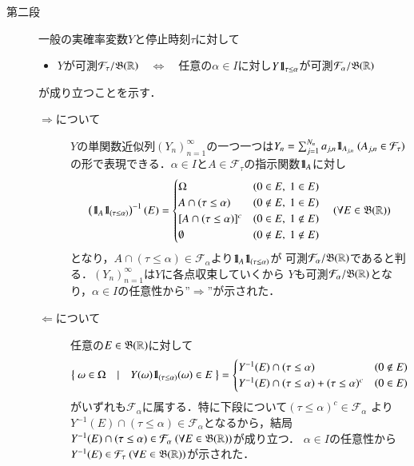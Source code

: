 \begin{prf}
\begin{description}
			\item[第二段] 一般の実確率変数$Y$と停止時刻$\tau$に対して
				\begin{itemize}
					\item $Y$が可測$\mathcal{F}_\tau/\mathfrak{B}(\mathbb{R})$$\quad \Leftrightarrow \quad$任意の$\alpha \in I$に対し$Y \mbox{1}\hspace{-0.25em}\mbox{l}_{\tau \leq \alpha}$が可測$\mathcal{F}_\alpha/\mathfrak{B}(\mathbb{R})$
				\end{itemize}
				が成り立つことを示す．
				\begin{description}
					\item[$\Rightarrow$について]
						$Y$の単関数近似列$(Y_n)_{n=1}^{\infty}$の一つ一つは$Y_n = \sum_{j=1}^{N_n}a_{j,n}\defunc_{A_{j,n}}\ (A_{j,n} \in \mathcal{F}_\tau)$
						の形で表現できる．$\alpha \in I$と$A \in \mathcal{F}_\tau$の指示関数$\mbox{1}\hspace{-0.25em}\mbox{l}_{A}$に対し
						\begin{align}
							\left( \mbox{1}\hspace{-0.25em}\mbox{l}_A\mbox{1}\hspace{-0.25em}\mbox{l}_{(\tau \leq \alpha)} \right)^{-1}(E) =
							\begin{cases}
								\Omega & (0 \in E,\ 1 \in E) \\
								A \cap (\tau \leq \alpha) & (0 \notin E,\ 1 \in E) \\
								[A \cap (\tau \leq \alpha)]^c & (0 \in E,\ 1 \notin E) \\
								\emptyset & (0 \notin E,\ 1 \notin E)
							\end{cases}
							\quad (\forall E \in \mathfrak{B}(\mathbb{R}))
						\end{align}
						となり，$A \cap (\tau \leq \alpha) \in \mathcal{F}_\alpha$より$\mbox{1}\hspace{-0.25em}\mbox{l}_A\mbox{1}\hspace{-0.25em}\mbox{l}_{(\tau \leq \alpha)}$が
						可測$\mathcal{F}_\alpha/\mathfrak{B}(\mathbb{R})$であると判る．$(Y_n)_{n=1}^{\infty}$は$Y$に各点収束していくから
						$Y$も可測$\mathcal{F}_\alpha/\mathfrak{B}(\mathbb{R})$となり，$\alpha \in I$の任意性から''$\Rightarrow$''が示された．
						
					\item[$\Leftarrow$について]
						任意の$E \in \mathfrak{B}(\mathbb{R})$に対して
						\begin{align}
							\left\{\ \omega \in \Omega\quad |\quad Y(\omega)\mbox{1}\hspace{-0.25em}\mbox{l}_{(\tau \leq \alpha)}(\omega) \in E\ \right\}
							= \begin{cases}
								Y^{-1}(E) \cap (\tau \leq \alpha) & (0 \notin E) \\
								Y^{-1}(E) \cap (\tau \leq \alpha) + (\tau \leq \alpha)^c & (0 \in E)
							\end{cases}
						\end{align}
						がいずれも$\mathcal{F}_\alpha$に属する．特に下段について$(\tau \leq \alpha)^c \in \mathcal{F}_\alpha$
						より$Y^{-1}(E) \cap (\tau \leq \alpha) \in \mathcal{F}_\alpha$となるから，結局
						$Y^{-1}(E) \cap (\tau \leq \alpha) \in \mathcal{F}_\alpha \ (\forall E \in \mathfrak{B}(\mathbb{R}))$が成り立つ．
						$\alpha \in I$の任意性から$Y^{-1}(E) \in \mathcal{F}_\tau\ (\forall E \in \mathfrak{B}(\mathbb{R}))$が示された．
				\end{description}
			

\end{description}
\end{prf}
